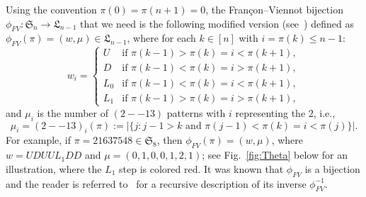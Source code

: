 \documentclass[11pt,reqno]{amsart}
\numberwithin{equation}{section}
\theoremstyle{plain}
\theoremstyle{definition}
\renewcommand{\S}{\mathfrak{S}}
\def\Lag{\mathfrak{L}}
\def\pp{\operatorname{(2--13)}}
\begin{document}
 Using the convention $\pi(0)=\pi(n+1)=0$, the  Fran\c{c}on--Viennot bijection  $\phi_{FV}:\S_n\rightarrow\Lag_{n-1}$ that we need  is the following modified version (see~\cite{LY}) defined as $\phi_{FV}(\pi)=(w,\mu)\in\Lag_{n-1}$, where for each $k\in[n]$ with $i=\pi(k)\leq n-1$:
$$
  w_i=\left\{
  \begin{array}{ll}
  U& \mbox{if $\pi(k-1)>\pi(k)=i<\pi(k+1)$},  \\
 D&\mbox{if $\pi(k-1)<\pi(k)=i>\pi(k+1)$},  \\
   L_0&\mbox{if $\pi(k-1)<\pi(k)=i<\pi(k+1)$},\\
  L_1 &\mbox{if $\pi(k-1)>\pi(k)=i>\pi(k+1)$},
  \end{array}
  \right.
  $$
  and $\mu_i$ is the number of $\pp$ patterns with $i$ representing the $2$, i.e.,
$$\mu_i=\pp_i(\pi):=|\{j: j-1>k\text{ and } \pi(j-1)<\pi(k)=i<\pi(j)\}|.$$
For example, if $\pi=21637548\in\S_8$, then $\phi_{FV}(\pi)=(w,\mu)$, where $w=UDUUL_1DD$ and $\mu=(0,1,0,0,1,2,1)$; see Fig.~\ref{fig:Theta} below for an illustration, where the $L_1$ step is colored red. It was known that $\phi_{FV}$ is a bijection and the reader is referred to~\cite{LY} for a recursive description of its inverse $\phi_{FV}^{-1}$.
\end{document}
